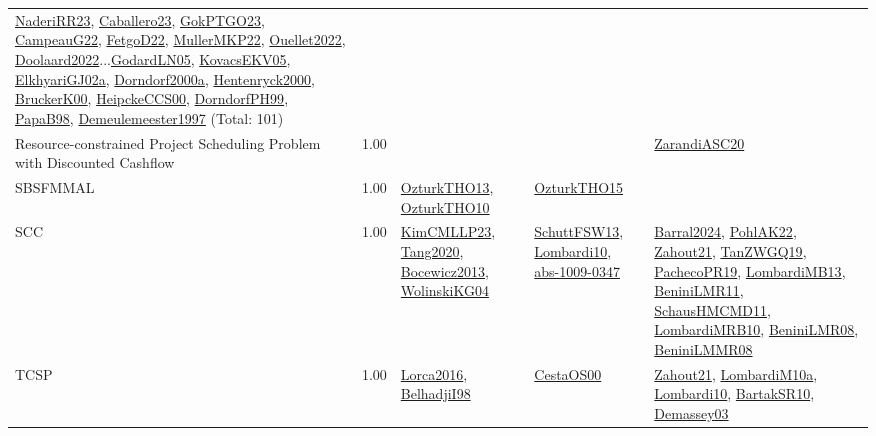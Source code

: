 {\begin{longtable}{p{3cm}r>{\raggedright\arraybackslash}p{6cm}>{\raggedright\arraybackslash}p{6cm}>{\raggedright\arraybackslash}p{8cm}}
\hyperref[detail:NaderiRR23]{NaderiRR23}, \hyperref[detail:Caballero23]{Caballero23}, \hyperref[detail:GokPTGO23]{GokPTGO23}, \hyperref[detail:CampeauG22]{CampeauG22}, \hyperref[detail:FetgoD22]{FetgoD22}, \hyperref[detail:MullerMKP22]{MullerMKP22}, \hyperref[detail:Ouellet2022]{Ouellet2022}, \hyperref[detail:Doolaard2022]{Doolaard2022}...\hyperref[detail:GodardLN05]{GodardLN05}, \hyperref[detail:KovacsEKV05]{KovacsEKV05}, \hyperref[detail:ElkhyariGJ02a]{ElkhyariGJ02a}, \hyperref[detail:Dorndorf2000a]{Dorndorf2000a}, \hyperref[detail:Hentenryck2000]{Hentenryck2000}, \hyperref[detail:BruckerK00]{BruckerK00}, \hyperref[detail:HeipckeCCS00]{HeipckeCCS00}, \hyperref[detail:DorndorfPH99]{DorndorfPH99}, \hyperref[detail:PapaB98]{PapaB98}, \hyperref[detail:Demeulemeester1997]{Demeulemeester1997} (Total: 101)\\
\index{Resource-constrained Project Scheduling Problem with Discounted Cashflow}\index{Classification!Resource-constrained Project Scheduling Problem with Discounted Cashflow}Resource-constrained Project Scheduling Problem with Discounted Cashflow &  1.00 &  &  & \hyperref[detail:ZarandiASC20]{ZarandiASC20}\\
\index{SBSFMMAL}\index{Classification!SBSFMMAL}SBSFMMAL &  1.00 & \hyperref[detail:OzturkTHO13]{OzturkTHO13}, \hyperref[detail:OzturkTHO10]{OzturkTHO10} & \hyperref[detail:OzturkTHO15]{OzturkTHO15} & \\
\index{SCC}\index{Classification!SCC}SCC &  1.00 & \hyperref[detail:KimCMLLP23]{KimCMLLP23}, \hyperref[detail:Tang2020]{Tang2020}, \hyperref[detail:Bocewicz2013]{Bocewicz2013}, \hyperref[detail:WolinskiKG04]{WolinskiKG04} & \hyperref[detail:SchuttFSW13]{SchuttFSW13}, \hyperref[detail:Lombardi10]{Lombardi10}, \hyperref[detail:abs-1009-0347]{abs-1009-0347} & \hyperref[detail:Barral2024]{Barral2024}, \hyperref[detail:PohlAK22]{PohlAK22}, \hyperref[detail:Zahout21]{Zahout21}, \hyperref[detail:TanZWGQ19]{TanZWGQ19}, \hyperref[detail:PachecoPR19]{PachecoPR19}, \hyperref[detail:LombardiMB13]{LombardiMB13}, \hyperref[detail:BeniniLMR11]{BeniniLMR11}, \hyperref[detail:SchausHMCMD11]{SchausHMCMD11}, \hyperref[detail:LombardiMRB10]{LombardiMRB10}, \hyperref[detail:BeniniLMR08]{BeniniLMR08}, \hyperref[detail:BeniniLMMR08]{BeniniLMMR08}\\
\index{TCSP}\index{Classification!TCSP}TCSP &  1.00 & \hyperref[detail:Lorca2016]{Lorca2016}, \hyperref[detail:BelhadjiI98]{BelhadjiI98} & \hyperref[detail:CestaOS00]{CestaOS00} & \hyperref[detail:Zahout21]{Zahout21}, \hyperref[detail:LombardiM10a]{LombardiM10a}, \hyperref[detail:Lombardi10]{Lombardi10}, \hyperref[detail:BartakSR10]{BartakSR10}, \hyperref[detail:Demassey03]{Demassey03}\\

\end{longtable}}

